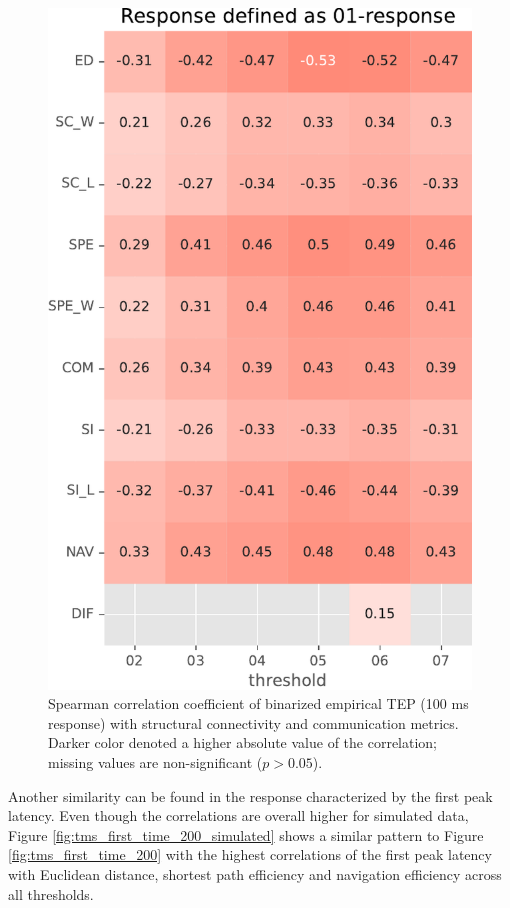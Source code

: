 \begin{figure}
    \centering
    \includegraphics[height=\textwidth]{images/nootebook_generated/tmseeg_results/simulated/100/not_over_threshold_nan/Response defined as 01-response.pdf}
    \caption[Binarized TEP (100 ms) correlations (simulated data)]{Spearman correlation coefficient of binarized empirical TEP (100 ms response) with structural connectivity and communication metrics. Darker color denoted a higher absolute value of the correlation; missing values are non-significant ($p>0.05$).}
    \label{fig:tms_binary_100_simulated}
\end{figure}

Another similarity can be found in the response characterized by the first peak latency. Even though the correlations are overall higher for simulated data, Figure \ref{fig:tms_first_time_200_simulated} shows a similar pattern to Figure \ref{fig:tms_first_time_200} with the highest correlations of the first peak latency with Euclidean distance, shortest path efficiency and navigation efficiency across all thresholds. 

